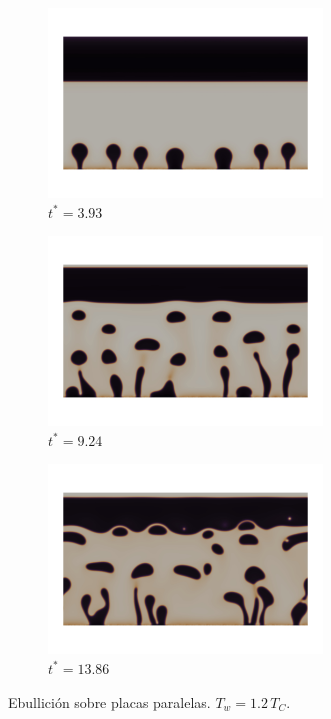 \begin{figure}[htb]
    \centering
    \begin{subfigure}[t]{0.9\textwidth}
        \centering
        \includegraphics[width=0.8\textwidth]{Imagenes/HetBoiling/Placas6/t_34k}   
        \vspace{-10mm}
        \caption{$t^*=3.93$}     
    \end{subfigure}
    \begin{subfigure}[t]{0.9\textwidth}
        \centering
        \includegraphics[width=0.8\textwidth]{Imagenes/HetBoiling/Placas6/t_80k}
        \vspace{-10mm}
        \caption{$t^*=9.24$}
    \end{subfigure}
    \begin{subfigure}[t]{0.9\textwidth}
        \centering
        \includegraphics[width=0.8\textwidth]{Imagenes/HetBoiling/Placas6/t_120k}
        \vspace{-10mm}
        \caption{$t^*=13.86$}
    \end{subfigure}    
    \caption{Ebullici\'on sobre placas paralelas. $T_w=1.2\,T_C$.}
    \label{fig:nucleate}
\end{figure}
